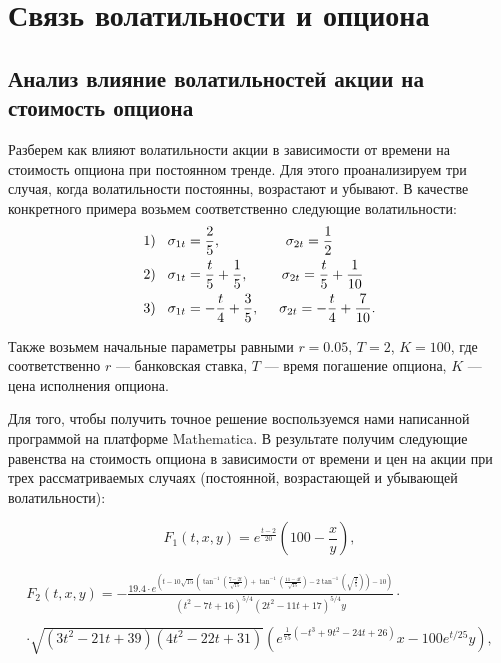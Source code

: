 \documentclass[a4paper, 12pt]{extreport}
\numberwithin{equation}{section}
\begin{document}
	\chapter{Связь волатильности и опциона}
	\section{Анализ влияние волатильностей акции на стоимость опциона}
	
	Разберем как влияют волатильности акции в зависимости от времени на стоимость опциона при постоянном тренде. Для этого проанализируем три случая, когда волатильности постоянны, возрастают и убывают. 
	В качестве конкретного примера возьмем соответственно следующие волатильности: 	
	\begin{align*}
	1) \hspace{0.3cm}\sigma_{1t}&=\frac{2}{5} , \hspace{1.63cm}\sigma_{2t}=\frac{1}{2} \\
	2) \hspace{0.3cm} \sigma_{1t}&=\frac{t}{5}+\frac{1}{5} ,\hspace{0.84cm} \sigma_{2t}=\frac{t}{5}+\frac{1}{10} \\
	3) \hspace{0.3cm} \sigma_{1t}&=-\frac{t}{4}+\frac{3}{5} , \hspace{0.5cm} \sigma_{2t}=-\frac{t}{4}+\frac{7}{10} .
	\end{align*}
	

	
	Также возьмем начальные параметры равными $r=0.05$, $T=2$, $K=100$, где соответственно $r$ --- банковская ставка, $T$ --- время погашение опциона, $K$ --- цена исполнения опциона. 
	
	Для того, чтобы получить точное решение воспользуемся нами написанной программой на платформе Mathematica. В результате получим следующие равенства на стоимость опциона в зависимости от времени и цен на акции при трех рассматриваемых случаях (постоянной, возрастающей и убывающей волатильности):
	
	\newpage
$${F_1}(t,x,y)=e^{\frac{t-2}{20}} \left(100-\frac{x}{y}\right) , $$	

	\begin{multline*}
		{ F_2}({t},{x},{y})=-\frac{19.4 \cdot e^{ \left(t-10 \sqrt{15} \left(\tan ^{-1}\left(\frac{7-2 t}{\sqrt{15}}\right)+\tan ^{-1}\left(\frac{11-4 t}{\sqrt{15}}\right)-2 \tan ^{-1}\left(\sqrt{\frac{3}{5}}\right)\right)-10\right)}}{\left(t^2-7 t+16\right)^{5/4} \left(2 t^2-11 t+17\right)^{5/4} y}  \cdot \\  \\ \cdot \sqrt{\left(3 t^2-21 t+39\right) \left(4 t^2-22 t+31\right)} \left(e^{\frac{1}{75} \left(-t^3+9 t^2-24 t+26\right)} x-100 e^{t/25} y\right) ,
	\end{multline*}
	
\end{document}
